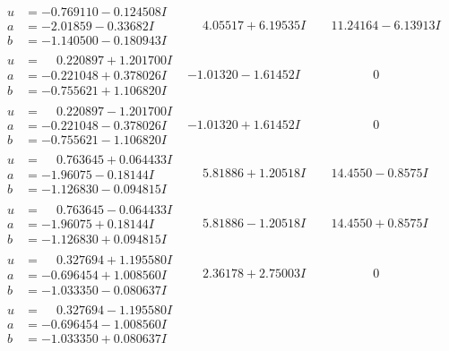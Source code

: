 \documentclass[1p]{elsarticle_modified}
\theoremstyle{definition}
\begin{document}
$$\begin{array}{c|c|c}
\begin{aligned}
u &= -0.769110 - 0.124508 I \\
a &= -2.01859 - 0.33682 I \\
b &= -1.140500 - 0.180943 I\end{aligned}
 & \phantom{-}4.05517 + 6.19535 I & \phantom{-}11.24164 - 6.13913 I \\ \hline\begin{aligned}
u &= \phantom{-}0.220897 + 1.201700 I \\
a &= -0.221048 + 0.378026 I \\
b &= -0.755621 + 1.106820 I\end{aligned}
 & -1.01320 - 1.61452 I & \phantom{-0.000000 } 0 \\ \hline\begin{aligned}
u &= \phantom{-}0.220897 - 1.201700 I \\
a &= -0.221048 - 0.378026 I \\
b &= -0.755621 - 1.106820 I\end{aligned}
 & -1.01320 + 1.61452 I & \phantom{-0.000000 } 0 \\ \hline\begin{aligned}
u &= \phantom{-}0.763645 + 0.064433 I \\
a &= -1.96075 - 0.18144 I \\
b &= -1.126830 - 0.094815 I\end{aligned}
 & \phantom{-}5.81886 + 1.20518 I & \phantom{-}14.4550 - 0.8575 I \\ \hline\begin{aligned}
u &= \phantom{-}0.763645 - 0.064433 I \\
a &= -1.96075 + 0.18144 I \\
b &= -1.126830 + 0.094815 I\end{aligned}
 & \phantom{-}5.81886 - 1.20518 I & \phantom{-}14.4550 + 0.8575 I \\ \hline\begin{aligned}
u &= \phantom{-}0.327694 + 1.195580 I \\
a &= -0.696454 + 1.008560 I \\
b &= -1.033350 - 0.080637 I\end{aligned}
 & \phantom{-}2.36178 + 2.75003 I & \phantom{-0.000000 } 0 \\ \hline\begin{aligned}
u &= \phantom{-}0.327694 - 1.195580 I \\
a &= -0.696454 - 1.008560 I \\
b &= -1.033350 + 0.080637 I\end{aligned}

\end{array}$$
\end{document}
